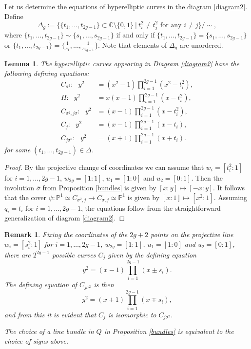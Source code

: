\documentclass{article}
\newtheorem{lem}[thm]{Lemma}
\newtheorem{rem}[thm]{Remark}
\numberwithin{equation}{section}
\newcommand{\s}{\sigma}
\begin{document}

Let us determine the equations of hyperelliptic curves in the diagram \ref{diagram2}. Define $$\Delta_g := \{\{t_1,\ldots, t_{2g-1}\} \subset \mathbb{C}\setminus \{0,1\} \ | \ t_i^2 \neq t_j^2 \text{ for any } i\neq j\}/\sim,$$ where \(\{t_1, \ldots, t_{2g-1}\} \sim \{s_1, \ldots, s_{2g-1}\}\) if and only if $\{t_1,\ldots, t_{2g-1}\} = \{s_1, \ldots, s_{2g-1}\}$ or $\{t_1, \ldots, t_{2g-1}\} = \{\frac{1}{s_1}, \ldots, \frac{1}{s_{2g-1}}\}$. Note that elements of $\Delta_g$ are unordered.

\begin{lem}
\label{equations}
    The hyperelliptic curves appearing in Diagram \ref{diagram2} have the following defining equations:
    \begin{align*}
    C_{\sigma^2}: \:\:\: y^2 &= (x^2 - 1)\prod_{i=1}^{2g-1}(x^2 - t_i^2), \\
    H: \:\:\: y^2 &= x(x - 1)\prod_{i=1}^{2g-1}(x - t_i^2), \\
    C_{\sigma^2,j\sigma}: \:\:\: y^2 &=(x - 1)\prod_{i=1}^{2g-1}(x - t_i^2), \\
    C_{j}: \:\:\: y^2 &=(x - 1)\prod_{i=1}^{2g-1}(x - t_i), \\
    C_{j\sigma^2}: \:\:\: y^2 &=(x + 1)\prod_{i=1}^{2g-1}(x + t_i).
    \end{align*} for some $(t_1,\ldots,t_{2g-1}) \in \Delta$.
\end{lem}

\begin{proof}
   
   By the projective change of coordinates we can assume that $w_i = [t_i^2:1]$ for $i=1,\ldots,2g-1$, $w_{2g} = [1:1]$, $u_1 = [1:0]$ and $u_2 = [0:1]$. Then the involution $\overline{\sigma}$ from Proposition \ref{bundles} is given by $[x:y] \mapsto [-x:y]$. It follows that the cover $\psi: \mathbb{P}^1 \simeq C_{\s^2, j} \to C_{\s, j} \simeq \mathbb{P}^1$ is given by $[x:1] \mapsto [x^2:1]$. Assuming $q_i = t_i$ for $i=1,\ldots,2g-1$, the equations follow from the straightforward generalization of diagram \ref{diagram2}. 
   
\end{proof}

\begin{rem}
\label{useful}
    Fixing the coordinates of the $2g+2$ points on the projective line $w_i = [s_i^2:1]$ for $i=1,\ldots,2g-1$, $w_{2g} = [1:1]$, $u_1 = [1:0]$ and $u_2 = [0:1]$, there are $2^{2g-1}$ possible curves $C_j$ given by the defining equation $$y^2 = (x-1)\prod_{i=1}^{2g-1}(x\pm s_i).$$ The defining equation of $C_{j\sigma^2}$ is then $$y^2 = (x+1)\prod_{i=1}^{2g-1}(x\mp s_i),$$ and from this it is evident that $C_j$ is isomorphic to $C_{j\sigma^2}$. 

    The choice of a line bundle in $Q$ in Proposition \ref{bundles} is equivalent to the choice of signs above.
\end{rem}
\end{document}
